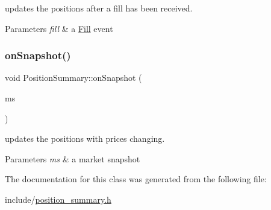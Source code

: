 updates the positions after a fill has been received. 


\begin{DoxyParams}{Parameters}
{\em fill} & a \hyperlink{classFill}{Fill} event \\
\hline
\end{DoxyParams}
\mbox{\label{classPositionSummary_a4f26c2e4e1776ad2e53ada32d46095e1}} 
\subsubsection{\texorpdfstring{on\+Snapshot()}{onSnapshot()}}
{\footnotesize\ttfamily void Position\+Summary\+::on\+Snapshot (\begin{DoxyParamCaption}\item[{const \hyperlink{classMarketSnapshot}{Market\+Snapshot} \&}]{ms }\end{DoxyParamCaption})}



updates the positions with prices changing. 


\begin{DoxyParams}{Parameters}
{\em ms} & a market snapshot \\
\hline
\end{DoxyParams}


The documentation for this class was generated from the following file\+:\begin{DoxyCompactItemize}
\item 
include/\hyperlink{position__summary_8h}{position\+\_\+summary.\+h}\end{DoxyCompactItemize}
